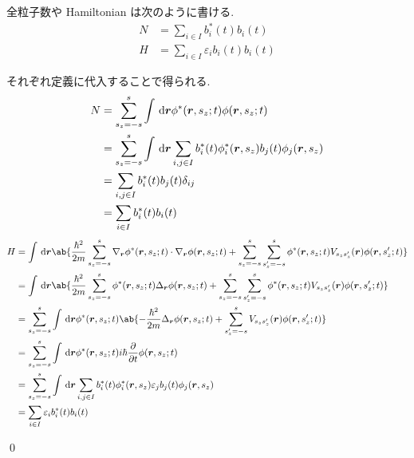 \documentclass[uplatex,dvipdfmx,a4paper,11pt]{jlreq}
\makeatletter
\newcommand{\rr}{\bm{r}}
\numberwithin{equation}{section}
\theoremstyle{definition}
\renewenvironment{proof}[1][\proofname]{\par
  \normalfont
  \topsep6\p@\@plus6\p@ \trivlist
  \item[\hskip\labelsep{\bfseries #1}\@addpunct{\bfseries}]\ignorespaces\quad\par
}{
  \qed\endtrivlist\@endpefalse
}
\renewcommand\proofname{証明}
\makeatother
\begin{document}
\begin{theorem}[Q21-102(v)(vi)]
  全粒子数や Hamiltonian は次のように書ける.
  \begin{align}
    N & = \sum_{i\in I}b_i^*(t)b_i(t)            \\
    H & = \sum_{i\in I}\varepsilon_ib_i(t)b_i(t)
  \end{align}
\end{theorem}
\begin{proof}
  それぞれ定義に代入することで得られる.
  \begin{align}
    N & = \sum_{s_z = -s}^{s}\int\dl{\rr}\phi^*(\rr, s_z; t)\phi(\rr, s_z; t)                             \\
      & = \sum_{s_z = -s}^{s}\int\dl{\rr}\sum_{i, j\in I}b_i^*(t)\phi_i^*(\rr, s_z)b_j(t)\phi_j(\rr, s_z) \\
      & = \sum_{i, j\in I}b_i^*(t)b_j(t)\delta_{ij}                                                       \\
      & = \sum_{i\in I}b_i^*(t)b_i(t)
  \end{align}
  \begin{align}
    H & = \int\dl{\rr}\ab\{\frac{\hbar^2}{2m}\sum_{s_z = -s}^{s}\nabla_{\rr}\phi^*(\rr, s_z; t)\cdot\nabla_{\rr}\phi(\rr, s_z; t) + \sum_{s_z = -s}^{s}\sum_{s_z' = -s}^{s}\phi^*(\rr, s_z; t)V_{s_zs_z'}(\rr)\phi(\rr, s_z'; t)\} \\
      & = \int\dl{\rr}\ab\{\frac{\hbar^2}{2m}\sum_{s_z = -s}^{s}\phi^*(\rr, s_z; t)\Delta_{\rr}\phi(\rr, s_z; t) + \sum_{s_z = -s}^{s}\sum_{s_z' = -s}^{s}\phi^*(\rr, s_z; t)V_{s_zs_z'}(\rr)\phi(\rr, s_z'; t)\}                  \\
      & = \sum_{s_z = -s}^{s}\int\dl{\rr}\phi^*(\rr, s_z; t)\ab\{-\frac{\hbar^2}{2m}\Delta_{\rr}\phi(\rr, s_z; t) + \sum_{s_z' = -s}^{s}V_{s_zs_z'}(\rr)\phi(\rr, s_z'; t)\}                                                       \\
      & = \sum_{s_z = -s}^{s}\int\dl{\rr}\phi^*(\rr, s_z; t)i\hbar\diffp{}{t}\phi(\rr, s_z; t)                                                                                                                                     \\
      & = \sum_{s_z = -s}^{s}\int\dl{\rr}\sum_{i, j\in I}b_i^*(t)\phi_i^*(\rr, s_z)\varepsilon_jb_j(t)\phi_j(\rr, s_z)                                                                                                             \\
      & = \sum_{i\in I}\varepsilon_ib_i^*(t)b_i(t)
  \end{align}
\end{proof}
\end{document}
